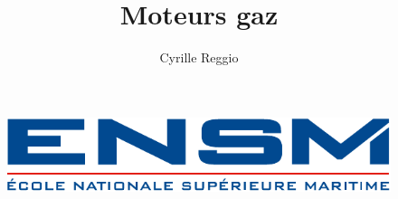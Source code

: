 \documentclass[12pt,a4paper]{article}
\author{Cyrille Reggio}
\title{Moteurs gaz}
\begin{document}
\thispagestyle{empty}
\begin{minipage}{0.45\textwidth}
	\begin{figure}[H]
		\includegraphics[scale=0.6]{img/ensm-logo.eps}
	\end{figure}
\end{minipage}

\begin{minipage}{0.9\textwidth}
\end{minipage}						

\vfill
			
\end{document}
